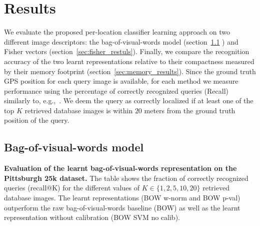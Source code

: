 \section{Results}
\label{sec:results}
  We evaluate the proposed per-location classifier learning approach on two different image descriptors: the bag-of-visual-words model (section~\ref{sec:bow_results} ) and Fisher vectors (section~\ref{sec:fisher_restuls}).  Finally, we compare the recognition accuracy of the two learnt representations relative to their compactness measured by their memory footprint (section~\ref{sec:memory_results}).
  Since the ground truth GPS position for each query image is available, for each method we measure performance using the percentage of correctly recognized queries (Recall) similarly to, e.g.,~\cite{Chen11,Knopp2010,Sattler-BMVC12}. We deem the query as correctly localized if at least one of the top $K$ retrieved database images is within $20$ meters from the ground truth position of the query. 


  \subsection{Bag-of-visual-words model}
  \label{sec:bow_results}
  
    \begin{table}[tbp]
      \begin{centering}
        
        \caption{ 
          \textbf{Evaluation of the learnt bag-of-visual-words representation on the Pittsburgh 25k dataset.}
          The table shows the fraction of correctly recognized queries (recall@K) for the different values of $K\in\{1,2,5,10,20\}$ retrieved database images. 
          The learnt representations (BOW w-norm and BOW p-val) outperform the raw bag-of-visual-words baseline (BOW) as well as the learnt representation without calibration (BOW SVM no calib).  
        }
        \label{tab:recallBOW}
      \end{centering}
    \end{table}

